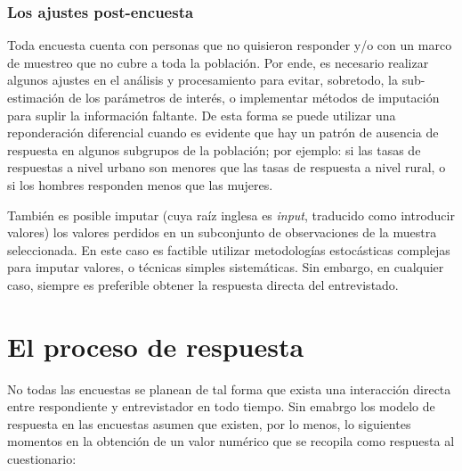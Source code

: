 \documentclass[
  12pt,
]{book}
\begin{document}
\hypertarget{los-ajustes-post-encuesta}{%
\subsubsection{Los ajustes post-encuesta}\label{los-ajustes-post-encuesta}}

Toda encuesta cuenta con personas que no quisieron responder y/o con un marco de muestreo que no cubre a toda la población. Por ende, es necesario realizar algunos ajustes en el análisis y procesamiento para evitar, sobretodo, la sub-estimación de los parámetros de interés, o implementar métodos de imputación para suplir la información faltante. De esta forma se puede utilizar una reponderación diferencial cuando es evidente que hay un patrón de ausencia de respuesta en algunos subgrupos de la población; por ejemplo: si las tasas de respuestas a nivel urbano son menores que las tasas de respuesta a nivel rural, o si los hombres responden menos que las mujeres.

También es posible imputar (cuya raíz inglesa es \emph{input}, traducido como introducir valores) los valores perdidos en un subconjunto de observaciones de la muestra seleccionada. En este caso es factible utilizar metodologías estocásticas complejas para imputar valores, o técnicas simples sistemáticas. Sin embargo, en cualquier caso, siempre es preferible obtener la respuesta directa del entrevistado.

\hypertarget{el-proceso-de-respuesta}{%
\section{El proceso de respuesta}\label{el-proceso-de-respuesta}}

No todas las encuestas se planean de tal forma que exista una interacción directa entre respondiente y entrevistador en todo tiempo. Sin emabrgo los modelo de respuesta en las encuestas asumen que existen, por lo menos, lo siguientes momentos en la obtención de un valor numérico que se recopila como respuesta al cuestionario:
\end{document}
